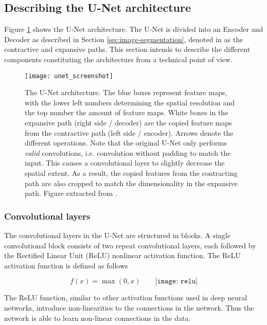 \documentclass[../main/thesis.tex]{subfiles}
\begin{document}
\subsection{Describing the U-Net architecture}
\label{sec:unet}
Figure \ref{fig:unet-overview} shows the U-Net architecture. The U-Net is divided into an Encoder and Decoder as described in Section \ref{sec:image-segmentation}, denoted in \citet{Ronneberger2015} as the contractive and expansive paths. This section intends to describe the different components constituting the architecture from a technical point of view. 

\begin{figure}
    \centering
    \texttt{[image: unet\_screenshot]}
    \caption{\label{fig:unet-overview}The U-Net architecture. The blue boxes represent feature maps, with the lower left numbers determining the spatial resolution and the top number the amount of feature maps. White boxes in the expansive path (right side / decoder) are the copied feature maps from the contractive path (left side / encoder). Arrows denote the different operations. Note that the original U-Net only performs \textit{valid} convolutions, i.e. convolution without padding to match the input. This causes a convolutional layer to slightly decrease the spatial extent. As a result, the copied features from the contracting path are also cropped to match the dimensionality in the expansive path. Figure extracted from \protect\citet{Ronneberger2015}.}
\end{figure}

\subsubsection{Convolutional layers}
The convolutional layers in the U-Net are structured in blocks. A single convolutional block consists of two repeat convolutional layers, each followed by the Rectified Linear Unit (ReLU) \citep{Nair2010} nonlinear activation function. The ReLU activation function is defined as follows

\begin{equation}
    f(x) = \max{(0,x)} \qquad
    \texttt{[image: relu]}
\end{equation}

The ReLU function, similar to other activation functions used in deep neural networks, introduce non-linearities to the connections in the network. Thus the network is able to learn non-linear connections in the data.
\end{document}
